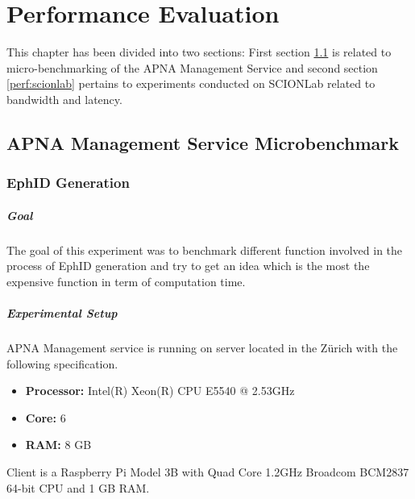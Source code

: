 
\chapter{Performance Evaluation} %
\label{performance} %
This chapter has been divided into two sections: First section \ref{perf:apna_ms} is related to micro-benchmarking of the APNA Management Service and second section \ref{perf:scionlab} pertains to experiments conducted on SCIONLab related to bandwidth and latency.

\section{APNA Management Service Microbenchmark} \label{perf:apna_ms}
\subsection{EphID Generation}
\paragraph{Goal}
The goal of this experiment was to benchmark different function involved in the process of EphID generation and try to get an idea which is the most the expensive function in term of computation time.
\paragraph{Experimental Setup}
APNA Management service is running on server located in the Z\"urich with the following specification.
\begin{itemize}
    \item \textbf{Processor:} Intel(R) Xeon(R) CPU E5540  @ 2.53GHz
    \item \textbf{Core:} 6
    \item \textbf{RAM:} 8 GB
\end{itemize}
Client is a Raspberry Pi Model 3B with Quad Core 1.2GHz Broadcom BCM2837 64-bit CPU and 1 GB RAM.
